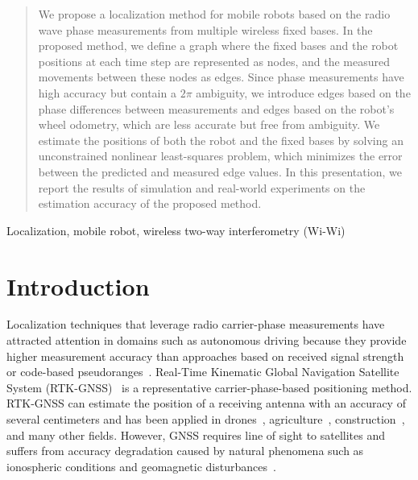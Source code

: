 \documentclass[conference]{IEEEtran}
\begin{document}
\maketitle

\begin{abstract}
We propose a localization method for mobile robots based on the radio wave phase measurements from multiple wireless fixed bases.
In the proposed method, we define a graph where the fixed bases and the robot positions at each time step are represented as nodes, and the measured movements between these nodes as edges.
Since phase measurements have high accuracy but contain a $2\pi$ ambiguity, we introduce edges based on the phase differences between measurements and edges based on the robot's wheel odometry, which are less accurate but free from ambiguity.
We estimate the positions of both the robot and the fixed bases by solving an unconstrained nonlinear least-squares problem, which minimizes the error between the predicted and measured edge values.
In this presentation, we report the results of simulation and real-world experiments on the estimation accuracy of the proposed method.
\end{abstract}

\begin{IEEEkeywords}
Localization, mobile robot, wireless two-way interferometry (Wi-Wi)
\end{IEEEkeywords}

\section{Introduction}
Localization techniques that leverage radio carrier-phase measurements have attracted attention in domains such as autonomous driving because they provide higher measurement accuracy than approaches based on received signal strength or code-based pseudoranges~\cite{gnss_autonomou_vehicles}.
Real-Time Kinematic Global Navigation Satellite System (RTK-GNSS)~\cite{RTK-GNSS} is a representative carrier-phase-based positioning method.
RTK-GNSS can estimate the position of a receiving antenna with an accuracy of several centimeters and has been applied in drones~\cite{RTK-M300}, agriculture~\cite{RTK-Agriculture}, construction~\cite{six-dump}, and many other fields.
However, GNSS requires line of sight to satellites and suffers from accuracy degradation caused by natural phenomena such as ionospheric conditions and geomagnetic disturbances~\cite{gnss_error,STANKOV2007485}.
\end{document}
